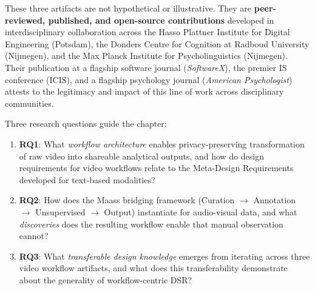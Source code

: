 \documentclass[../main.tex]{subfiles}
\begin{document}
These three artifacts are not hypothetical or illustrative. They are \textbf{peer-reviewed, published, and open-source contributions} developed in interdisciplinary collaboration across the Hasso Plattner Institute for Digital Engineering (Potsdam), the Donders Centre for Cognition at Radboud University (Nijmegen), and the Max Planck Institute for Psycholinguistics (Nijmegen). Their publication at a flagship software journal (\textit{SoftwareX}), the premier IS conference (ICIS), and a flagship psychology journal (\textit{American Psychologist}) attests to the legitimacy and impact of this line of work across disciplinary communities.

Three research questions guide the chapter:

\begin{enumerate}
    \item \textbf{RQ1}: What \textit{workflow architecture} enables privacy-preserving transformation of raw video into shareable analytical outputs, and how do design requirements for video workflows relate to the Meta-Design Requirements developed for text-based modalities?
    \item \textbf{RQ2}: How does the Maass bridging framework (Curation $\rightarrow$ Annotation $\rightarrow$ Unsupervised $\rightarrow$ Output) instantiate for audio-visual data, and what \textit{discoveries} does the resulting workflow enable that manual observation cannot?
    \item \textbf{RQ3}: What \textit{transferable design knowledge} emerges from iterating across three video workflow artifacts, and what does this transferability demonstrate about the generality of workflow-centric DSR?
\end{enumerate}
\end{document}
